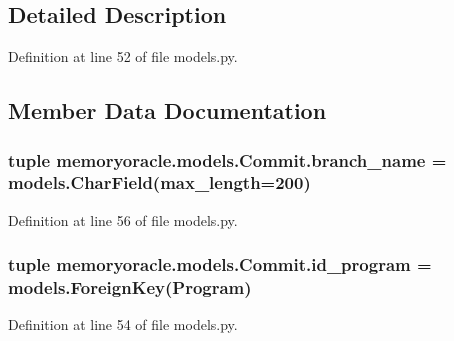 \subsection{Detailed Description}


Definition at line 52 of file models.\+py.



\subsection{Member Data Documentation}
\hypertarget{classmemoryoracle_1_1models_1_1Commit_a1ac382bebfef4bd3e24548ad08cda47a}{}
\subsubsection[{branch\+\_\+name}]{\setlength{\rightskip}{0pt plus 5cm}tuple memoryoracle.\+models.\+Commit.\+branch\+\_\+name = models.\+Char\+Field(max\+\_\+length=200)\hspace{0.3cm}{\ttfamily [static]}}\label{classmemoryoracle_1_1models_1_1Commit_a1ac382bebfef4bd3e24548ad08cda47a}


Definition at line 56 of file models.\+py.

\hypertarget{classmemoryoracle_1_1models_1_1Commit_a874612ef3353692531dbdde8f1a17609}{}
\subsubsection[{id\+\_\+program}]{\setlength{\rightskip}{0pt plus 5cm}tuple memoryoracle.\+models.\+Commit.\+id\+\_\+program = models.\+Foreign\+Key({\bf Program})\hspace{0.3cm}{\ttfamily [static]}}\label{classmemoryoracle_1_1models_1_1Commit_a874612ef3353692531dbdde8f1a17609}


Definition at line 54 of file models.\+py.

\hypertarget{classmemoryoracle_1_1models_1_1Commit_a6c92b2816250c6dfc2ae6f67e94fa472}{}
